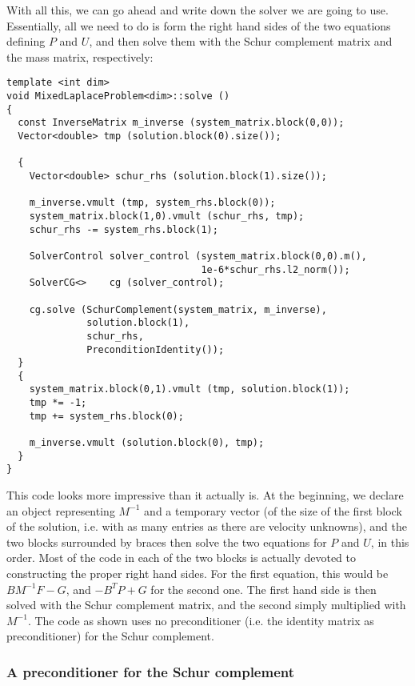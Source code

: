 \documentclass{article}
\begin{document}
With all this, we can go ahead and write down the solver we are going to
use. Essentially, all we need to do is form the right hand sides of the two
equations defining $P$ and $U$, and then solve them with the Schur complement
matrix and the mass matrix, respectively:
\begin{verbatim}
template <int dim>
void MixedLaplaceProblem<dim>::solve () 
{
  const InverseMatrix m_inverse (system_matrix.block(0,0));
  Vector<double> tmp (solution.block(0).size());
  
  {
    Vector<double> schur_rhs (solution.block(1).size());

    m_inverse.vmult (tmp, system_rhs.block(0));
    system_matrix.block(1,0).vmult (schur_rhs, tmp);
    schur_rhs -= system_rhs.block(1);

    SolverControl solver_control (system_matrix.block(0,0).m(),
                                  1e-6*schur_rhs.l2_norm());
    SolverCG<>    cg (solver_control);

    cg.solve (SchurComplement(system_matrix, m_inverse),
              solution.block(1),
              schur_rhs,
              PreconditionIdentity());
  }
  {
    system_matrix.block(0,1).vmult (tmp, solution.block(1));
    tmp *= -1;
    tmp += system_rhs.block(0);
    
    m_inverse.vmult (solution.block(0), tmp);
  }
}
\end{verbatim}

This code looks more impressive than it actually is. At the beginning, we
declare an object representing $M^{-1}$ and a temporary vector (of the size of
the first block of the solution, i.e. with as many entries as there are
velocity unknowns), and the two blocks surrounded by braces then solve the two
equations for $P$ and $U$, in this order. Most of the code in each of the two
blocks is actually devoted to constructing the proper right hand sides. For
the first equation, this would be $BM^{-1}F-G$, and $-B^TP+G$ for the second
one. The first hand side is then solved with the Schur complement matrix, and
the second simply multiplied with $M^{-1}$. The code as shown uses no
preconditioner (i.e. the identity matrix as preconditioner) for the Schur
complement.



\subsubsection*{A preconditioner for the Schur complement}
\end{document}
